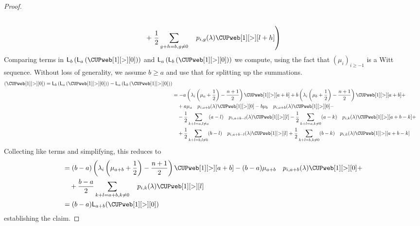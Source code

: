 \documentclass{amsart}
\numberwithin{equation}{section}
\theoremstyle{definition}
\newcommand{\LLn}[1][n]{{\mathsf{L}_{#1}}}
\begin{document}
\begin{proof}
\begin{align*}
        \\ &\quad + \left. \frac{1}{2} \sum_{g + h = b, g \neq 0} \quad p_{i,g}(\lambda) \CUPweb[1][>][l + h]  \right)
    \end{align*}
Comparing terms in $\LLn[b]\left(\LLn[a]\left(\CUPweb[1][>][0]\right)\right)$ and $\LLn[a]\left(\LLn[b]\left(\CUPweb[1][>][0]\right)\right)$ we compute, using the fact that $(\mu_i)_{i\geq -1}$ is a Witt sequence. Without loss of generality, we assume $b \geq a$ and use that for splitting up the summations.
    \begin{align*}
      [\LLn[a]&, \LLn[b]]\left(\CUPweb[1][>][0]\right) = \LLn[b]\left(\LLn[a]\left(\CUPweb[1][>][0]\right)\right) - \LLn[a]\left(\LLn[b]\left(\CUPweb[1][>][0]\right)\right) \\
      &= -a \left(\lambda_i \left(\mu_a + \frac{1}{2}\right) - \frac{n+1}{2}\right) \CUPweb[1][>][a + b]  + b \left(\lambda_i \left(\mu_b + \frac{1}{2}\right) - \frac{n+1}{2}\right) \CUPweb[1][>][a + b] + \\
      &\quad +  a \mu_a \quad p_{i,a + b}(\lambda) \CUPweb[1][>][0]  -  b \mu_b \quad p_{i,a + b}(\lambda) \CUPweb[1][>][0]  -\\
      &\quad - \frac{1}{2}  \sum_{k + l = a, l \neq a} (a - l) \quad p_{i,a + b -l}(\lambda) \CUPweb[1][>][l] - \frac{1}{2}  \sum_{k + l = a, k \neq 0} (a- k) \quad p_{i,k}(\lambda) \CUPweb[1][>][a+ b - k] + \\
      &\quad + \frac{1}{2}  \sum_{k + l = b, l \neq b} (b - l) \quad p_{i, a + b - l}(\lambda) \CUPweb[1][>][l] + \frac{1}{2}  \sum_{k + l = b, k \neq 0} (b- k) \quad p_{i,k}(\lambda) \CUPweb[1][>][a + b - k] 
\end{align*}
Collecting like terms and simplifying, this reduces to    
\begin{align*} 
      &= (b- a) \left(\lambda_i \left(\mu_{a+b} + \frac{1}{2}\right) - \frac{n+1}{2}\right) \CUPweb[1][>][a + b] - (b-a) \mu_{a+b} \quad p_{i,a + b}(\lambda) \CUPweb[1][>][0]+ \\
      &\quad + \frac{b-a}{2} \sum_{k+l = a+b, k \neq 0}  \quad p_{i,k}(\lambda) \CUPweb[1][>][l] \\
      &= (b-a)\LLn[a+b] (\CUPweb[1][>][0])
    \end{align*}
establishing the claim. 
\end{proof}
\end{document}
